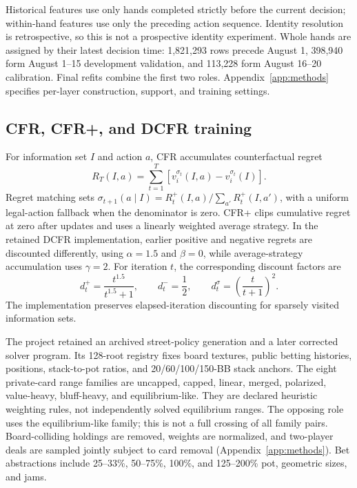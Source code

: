 \documentclass[11pt]{article}
\begin{document}
Historical features use only hands completed strictly before the current decision; within-hand features use only the preceding action sequence. Identity resolution is retrospective, so this is not a prospective identity experiment. Whole hands are assigned by their latest decision time: 1,821,293 rows precede August 1, 398,940 form August 1--15 development validation, and 113,228 form August 16--20 calibration. Final refits combine the first two roles. Appendix~\ref{app:methods} specifies per-layer construction, support, and training settings.

\subsection{CFR, CFR+, and DCFR training}
For information set \(I\) and action \(a\), CFR accumulates counterfactual regret
\begin{equation}
R_T(I,a)=\sum_{t=1}^{T}\left[v_i^{\sigma_t}(I,a)-v_i^{\sigma_t}(I)\right].
\end{equation}
Regret matching sets \(\sigma_{t+1}(a\mid I)=R_t^+(I,a)/\sum_{a'}R_t^+(I,a')\), with a uniform legal-action fallback when the denominator is zero. CFR+ clips cumulative regret at zero after updates and uses a linearly weighted average strategy. In the retained DCFR implementation, earlier positive and negative regrets are discounted differently, using \(\alpha=1.5\) and \(\beta=0\), while average-strategy accumulation uses \(\gamma=2\). For iteration \(t\), the corresponding discount factors are
\begin{equation}
d_t^+=\frac{t^{1.5}}{t^{1.5}+1},\qquad
d_t^-=\frac{1}{2},\qquad
d_t^\sigma=\left(\frac{t}{t+1}\right)^2.
\end{equation}
The implementation preserves elapsed-iteration discounting for sparsely visited information sets.

The project retained an archived street-policy generation and a later corrected solver program. Its 128-root registry fixes board textures, public betting histories, positions, stack-to-pot ratios, and 20/60/100/150-BB stack anchors. The eight private-card range families are uncapped, capped, linear, merged, polarized, value-heavy, bluff-heavy, and equilibrium-like. They are declared heuristic weighting rules, not independently solved equilibrium ranges. The opposing role uses the equilibrium-like family; this is not a full crossing of all family pairs. Board-colliding holdings are removed, weights are normalized, and two-player deals are sampled jointly subject to card removal (Appendix~\ref{app:methods}). Bet abstractions include 25--33\%, 50--75\%, 100\%, and 125--200\% pot, geometric sizes, and jams.
\end{document}
